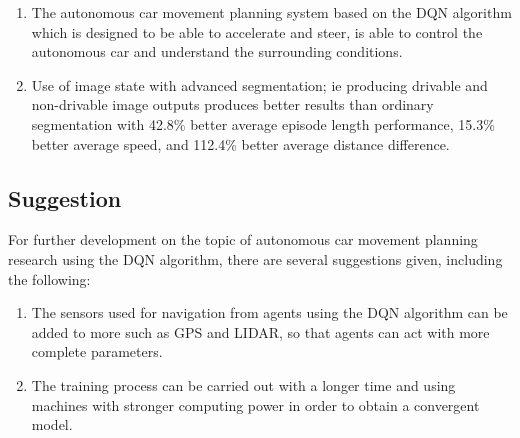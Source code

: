 \documentclass[conference]{IEEEtran}
\begin{document}
	\begin{enumerate}
		
		\item The autonomous car movement planning system based on the DQN algorithm which is designed to be able to accelerate and steer, is able to control the autonomous car and understand the surrounding conditions.
		
		\item Use of image state with advanced segmentation; ie producing drivable and non-drivable image outputs produces better results than ordinary segmentation with 42.8\% better average episode length performance, 15.3\% better average speed, and 112.4\% better average distance difference.
		
	\end{enumerate}
	
	\subsection{Suggestion}
	\label{chap:saran}
	
	For further development on the topic of autonomous car movement planning research using the DQN algorithm, there are several suggestions given, including the following:
	
	\begin{enumerate}
		
		\item The sensors used for navigation from agents using the DQN algorithm can be added to more such as GPS and LIDAR, so that agents can act with more complete parameters.
		
		\item The training process can be carried out with a longer time and using machines with stronger computing power in order to obtain a convergent model.
	\end{enumerate}
	
	
	
\end{document}

